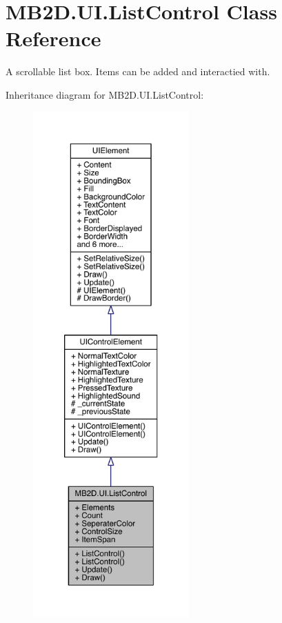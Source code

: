 \hypertarget{class_m_b2_d_1_1_u_i_1_1_list_control}{}\section{M\+B2\+D.\+U\+I.\+List\+Control Class Reference}
\label{class_m_b2_d_1_1_u_i_1_1_list_control}


A scrollable list box. Items can be added and interactied with.  




Inheritance diagram for M\+B2\+D.\+U\+I.\+List\+Control\+:\nopagebreak
\begin{figure}[H]
\begin{center}
\leavevmode
\includegraphics[height=550pt]{class_m_b2_d_1_1_u_i_1_1_list_control__inherit__graph}
\end{center}
\end{figure}



